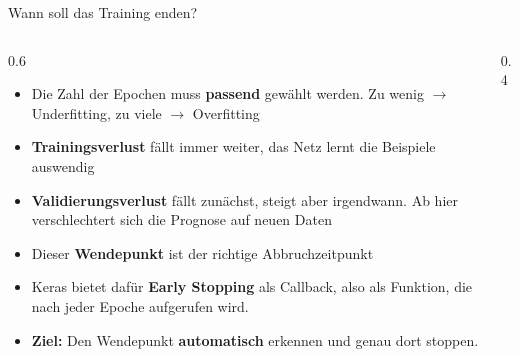 \begin{frame}{Wann soll das Training enden?}
\footnotesize
\begin{columns}
\begin{column}{0.6\linewidth}
\begin{itemize}
  \item Die Zahl der Epochen muss \textbf{passend} gewählt werden. Zu wenig $\rightarrow$ Underfitting, zu viele $\rightarrow$ Overfitting
  \item \textbf{Trainingsverlust} fällt  immer weiter, das Netz lernt die Beispiele auswendig
  \item \textbf{Validierungsverlust} fällt zunächst, steigt aber irgendwann. Ab hier verschlechtert sich die Prognose auf neuen Daten
  \item Dieser \textbf{Wendepunkt} ist der richtige Abbruchzeitpunkt
  \item Keras bietet dafür \textbf{Early Stopping} als Callback, also als Funktion, die nach jeder Epoche aufgerufen wird.
  \item \textbf{Ziel:} Den Wendepunkt \textbf{automatisch} erkennen und genau dort stoppen.
\end{itemize}
\end{column}
\begin{column}{0.4\linewidth}
\centering

\end{column}
\end{columns}
\end{frame}

